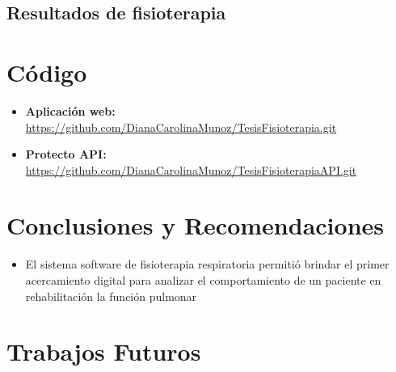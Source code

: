 \documentclass[12pt]{article}
\begin{document}
 \subsection{Resultados de fisioterapia}



\section{Código}

\begin{itemize}
    \item \textbf{Aplicación web:} \url{https://github.com/DianaCarolinaMunoz/TesisFisioterapia.git}
    \item \textbf{Protecto API:} \url{https://github.com/DianaCarolinaMunoz/TesisFisioterapiaAPI.git}
\end{itemize}








\section{Conclusiones y Recomendaciones}
\begin{itemize}
    \item El sistema software de fisioterapia respiratoria permitió brindar el primer acercamiento digital para analizar el comportamiento de un paciente en rehabilitación la función pulmonar

\end{itemize}


\section{Trabajos Futuros}




\newpage





\nocite{1}
\nocite{2}
\nocite{3}
\nocite{4}
\nocite{5}
\end{document}
